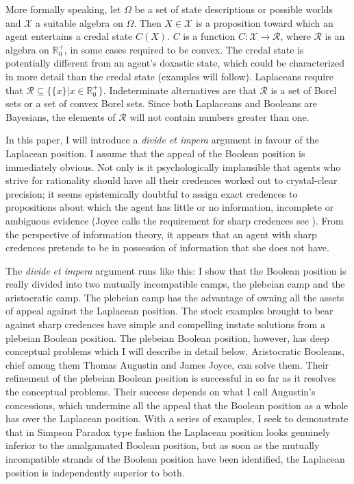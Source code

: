 \documentclass[12pt]{article}
\begin{document}
More formally speaking, let $\Omega$ be a set of state descriptions or
possible worlds and $\mathcal{X}$ a suitable algebra on $\Omega$. Then
$X\in\mathcal{X}$ is a proposition toward which an agent entertains a
credal state $C(X)$. $C$ is a function
$C:\mathcal{X}\rightarrow\mathcal{R}$, where $\mathcal{R}$ is an
algebra on $\mathbb{R}^{+}_{0}$, in some cases required to be convex.
The credal state is potentially different from an agent's doxastic
state, which could be characterized in more detail than the credal
state (examples will follow). Laplaceans require that
$\mathcal{R}\subseteq\{\{x\}|x\in\mathbb{R}^{+}_{0}\}$. Indeterminate
alternatives are that $\mathcal{R}$ is a set of Borel sets or a set of
convex Borel sets. Since both Laplaceans and Booleans are Bayesians,
the elements of $\mathcal{R}$ will not contain numbers greater than
one.

In this paper, I will introduce a \emph{divide et impera}
argument in favour of the Laplacean position. I assume that the appeal
of the Boolean position is immediately obvious. Not only is it
psychologically implausible that agents who strive for rationality
should have all their credences worked out to crystal-clear precision;
it seems epistemically doubtful to assign exact credences to
propositions about which the agent has little or no information,
incomplete or ambiguous evidence (Joyce calls the requirement for
sharp credences  see ). From
the perspective of information theory, it appears that an agent with
sharp credences pretends to be in possession of information that she
does not have.

The \emph{divide et impera} argument runs like this: I show that the
Boolean position is really divided into two mutually incompatible
camps, the plebeian camp and the aristocratic camp. The plebeian camp
has the advantage of owning all the assets of appeal against the
Laplacean position. The stock examples brought to bear against sharp
credences have simple and compelling instate solutions from a plebeian
Boolean position. The plebeian Boolean position, however, has deep
conceptual problems which I will describe in detail below.
Aristocratic Booleans, chief among them Thomas Augustin and James
Joyce, can solve them. Their refinement of the plebeian Boolean
position is successful in so far as it resolves the conceptual
problems. Their success depends on what I call Augustin's concessions,
which undermine all the appeal that the Boolean position as a whole
has over the Laplacean position. With a series of examples, I seek to
demonstrate that in Simpson Paradox type fashion the Laplacean
position looks genuinely inferior to the amalgamated Boolean position,
but as soon as the mutually incompatible strands of the Boolean
position have been identified, the Laplacean position is independently
superior to both.
\end{document}
